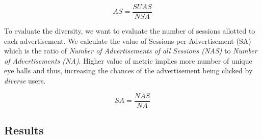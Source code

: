 \begin{equation}
AS = \frac{SUAS}{NSA}     
\end{equation}



To evaluate the diversity, we want to evaluate the number of sessions allotted to each advertisement. We calculate the value of Sessions per Advertisement (SA) which is  the ratio of  {\it Number of Advertisements of  all Sessions (NAS)} to {\it Number of Advertisements (NA)}. Higher value of metric implies more number of unique eye balls and thus, increasing the chances of the advertisement being clicked by {\it diverse} users.

\begin{equation}
 SA = \frac{NAS}{NA}    
\end{equation}
 
\par

\subsection{Results}


